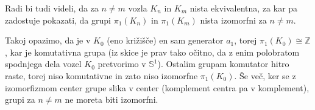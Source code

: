 \documentclass[a4paper, 12pt]{article}
\renewcommand{\S}{\mathbb{S}}
\newcommand{\Z}{\mathbb{Z}}
\newcommand{\iso}{\cong}
\begin{document}
Radi bi tudi videli, da za $n \neq m$ vozla $K_n$ in $K_m$ nista ekvivalentna, za kar pa zadostuje pokazati, da grupi $\pi_1(K_n)$ in $\pi_1(K_m)$ nista izomorfni za $n \neq m$.

Takoj opazimo, da je v $K_0$ (eno križišče) en sam generator $a_1$, torej $\pi_1(K_0) \iso \Z$, kar je komutativna grupa (iz skice je prav tako očitno, da z enim polobratom spodnjega dela vozel $K_0$ pretvorimo v $\S^1$). Ostalim grupam komutator hitro raste, torej niso komutativne in zato niso izomorfne $\pi_1(K_0)$. Še več, ker se z izomorfizmom center grupe slika v center (komplement centra pa v komplement), grupi za $n \neq m$ ne moreta biti izomorfni.
\end{document}
